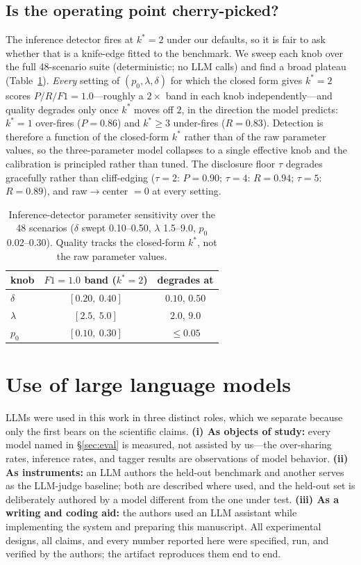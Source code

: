 \documentclass{article}
\begin{document}
\subsection{Is the operating point cherry-picked?}
The inference detector fires at $k^{*}{=}2$ under our defaults, so it is fair to ask
whether that is a knife-edge fitted to the benchmark. We sweep each knob over the full
48-scenario suite (deterministic; no LLM calls) and find a broad plateau
(Table~\ref{tab:sens}). \emph{Every} setting of $(p_0,\lambda,\delta)$ for which the
closed form gives $k^{*}{=}2$ scores $P/R/F1=1.0$---roughly a $2\times$ band in each
knob independently---and quality degrades only once $k^{*}$ moves off $2$, in the
direction the model predicts: $k^{*}{=}1$ over-fires ($P{=}0.86$) and $k^{*}\ge3$
under-fires ($R{=}0.83$). Detection is therefore a function of the closed-form
$k^{*}$ rather than of the raw parameter values, so the three-parameter model
collapses to a single effective knob and the calibration is principled rather than
tuned. The disclosure floor $\tau$ degrades gracefully rather than cliff-edging
($\tau{=}2$: $P{=}0.90$; $\tau{=}4$: $R{=}0.94$; $\tau{=}5$: $R{=}0.89$), and
raw$\to$center $=0$ at every setting.

\begin{table}[t]\centering\small
\begin{tabular}{lcc}
\toprule
knob & $F1{=}1.0$ band ($k^{*}{=}2$) & degrades at \\
\midrule
$\delta$  & $[0.20,\ 0.40]$ & $0.10$, $0.50$ \\
$\lambda$ & $[2.5,\ 5.0]$   & $2.0$, $9.0$ \\
$p_0$     & $[0.10,\ 0.30]$ & $\le 0.05$ \\
\bottomrule
\end{tabular}
\caption{Inference-detector parameter sensitivity over the 48 scenarios
($\delta$ swept 0.10--0.50, $\lambda$ 1.5--9.0, $p_0$ 0.02--0.30). Quality tracks the
closed-form $k^{*}$, not the raw parameter values.}
\label{tab:sens}
\end{table}




\section{Use of large language models}
LLMs were used in this work in three distinct roles, which we separate because
only the first bears on the scientific claims. \textbf{(i) As objects of study:}
every model named in \S\ref{sec:eval} is measured, not assisted by us---the
over-sharing rates, inference rates, and tagger results are observations of model
behavior. \textbf{(ii) As instruments:} an LLM authors the held-out benchmark and
another serves as the LLM-judge baseline; both are described where used, and the
held-out set is deliberately authored by a model different from the one under
test. \textbf{(iii) As a writing and coding aid:} the authors used an LLM
assistant while implementing the system and preparing this manuscript. All
experimental designs, all claims, and every number reported here were specified,
run, and verified by the authors; the artifact reproduces them end to end.



\end{document}
